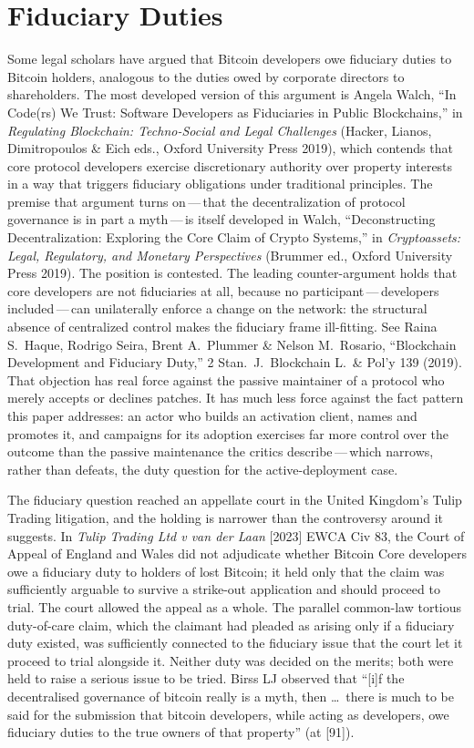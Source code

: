 \documentclass[11pt, twoside, openright]{book}
\begin{document}
\section{Fiduciary Duties}

Some legal scholars have argued that Bitcoin developers owe fiduciary duties to Bitcoin holders, analogous to the duties owed by corporate directors to shareholders. The most developed version of this argument is Angela Walch, ``In Code(rs) We Trust: Software Developers as Fiduciaries in Public Blockchains,'' in \textit{Regulating Blockchain: Techno-Social and Legal Challenges} (Hacker, Lianos, Dimitropoulos \& Eich eds., Oxford University Press 2019), which contends that core protocol developers exercise discretionary authority over property interests in a way that triggers fiduciary obligations under traditional principles. The premise that argument turns on\,---\,that the decentralization of protocol governance is in part a myth\,---\,is itself developed in Walch, ``Deconstructing Decentralization: Exploring the Core Claim of Crypto Systems,'' in \textit{Cryptoassets: Legal, Regulatory, and Monetary Perspectives} (Brummer ed., Oxford University Press 2019). The position is contested. The leading counter-argument holds that core developers are not fiduciaries at all, because no participant\,---\,developers included\,---\,can unilaterally enforce a change on the network: the structural absence of centralized control makes the fiduciary frame ill-fitting. See Raina S.~Haque, Rodrigo Seira, Brent A.~Plummer \& Nelson M.~Rosario, ``Blockchain Development and Fiduciary Duty,'' 2 Stan.~J.~Blockchain L.~\& Pol'y 139 (2019). That objection has real force against the passive maintainer of a protocol who merely accepts or declines patches. It has much less force against the fact pattern this paper addresses: an actor who builds an activation client, names and promotes it, and campaigns for its adoption exercises far more control over the outcome than the passive maintenance the critics describe\,---\,which narrows, rather than defeats, the duty question for the active-deployment case.

The fiduciary question reached an appellate court in the United Kingdom's Tulip Trading litigation, and the holding is narrower than the controversy around it suggests. In \textit{Tulip Trading Ltd v van der Laan} [2023] EWCA Civ 83, the Court of Appeal of England and Wales did not adjudicate whether Bitcoin Core developers owe a fiduciary duty to holders of lost Bitcoin; it held only that the claim was sufficiently arguable to survive a strike-out application and should proceed to trial. The court allowed the appeal as a whole. The parallel common-law tortious duty-of-care claim, which the claimant had pleaded as arising only if a fiduciary duty existed, was sufficiently connected to the fiduciary issue that the court let it proceed to trial alongside it. Neither duty was decided on the merits; both were held to raise a serious issue to be tried. Birss LJ observed that ``[i]f the decentralised governance of bitcoin really is a myth, then \ldots\ there is much to be said for the submission that bitcoin developers, while acting as developers, owe fiduciary duties to the true owners of that property'' (at [91]).
\end{document}
